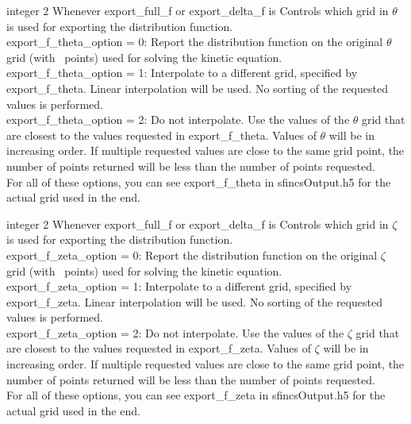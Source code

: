 {integer}
{2}
{Whenever {\ttfamily export\_full\_f} or {\ttfamily export\_delta\_f} is \true}
{Controls which grid in $\theta$ is used for exporting the distribution function.\\

{\ttfamily export\_f\_theta\_option} = 0: Report the distribution function on the original $\theta$ grid (with \Ntheta~points) used for solving the kinetic equation.\\

{\ttfamily export\_f\_theta\_option} = 1: Interpolate to a different grid, specified by {\ttfamily export\_f\_theta}. Linear interpolation will be used.
No sorting of the requested values is performed.\\

{\ttfamily export\_f\_theta\_option} = 2: Do not interpolate. Use the
values of the $\theta$ grid that are closest to the values requested
in {\ttfamily export\_f\_theta}.  Values of $\theta$ will be in
increasing order. If multiple requested values are close to the same
grid point, the number of points returned will be less than the number
of points requested. \\

For all of these options, you can see {\ttfamily export\_f\_theta} in {\ttfamily sfincsOutput.h5} for the actual grid used in the end.
}

\myhrule

{integer}
{2}
{Whenever {\ttfamily export\_full\_f} or {\ttfamily export\_delta\_f} is \true}
{Controls which grid in $\zeta$ is used for exporting the distribution function.\\

{\ttfamily export\_f\_zeta\_option} = 0: Report the distribution function on the original $\zeta$ grid (with \Nzeta~points) used for solving the kinetic equation.\\

{\ttfamily export\_f\_zeta\_option} = 1: Interpolate to a different grid, specified by {\ttfamily export\_f\_zeta}. Linear interpolation will be used.
No sorting of the requested values is performed.\\

{\ttfamily export\_f\_zeta\_option} = 2: Do not interpolate. Use the
values of the $\zeta$ grid that are closest to the values requested
in {\ttfamily export\_f\_zeta}.  Values of $\zeta$ will be in
increasing order. If multiple requested values are close to the same
grid point, the number of points returned will be less than the number
of points requested. \\

For all of these options, you can see {\ttfamily export\_f\_zeta} in {\ttfamily sfincsOutput.h5} for the actual grid used in the end.
}

